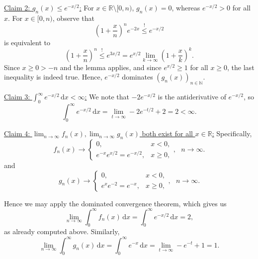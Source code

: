 \documentclass[10pt]{article}\usepackage[]{graphicx}\usepackage[]{color}
\newcommand{\N}{\mathbb{N}}
\newcommand{\R}{\mathbb{R}}
\newcommand{\df}{\,\textrm{d}}
\begin{document}
\uline{Claim 2: $g_n(x) \leq e^{-x/2}$:}
For $x \in \R \setminus [0,n)$, $g_n(x) = 0$, whereas $e^{-x/2} > 0$ for all $x$.
For $x \in [0,n)$, observe that
\[
 \left(1 + \frac{x}{n}\right)^n e^{-2x} \stackrel{!}{\leq} e^{-x/2}
\]
is equivalent to
\[
  \left(1 + \frac{x}{n}\right)^n \stackrel{!}{\leq} e^{3x/2} = e^{x/2}\lim_{k \to \infty}\left(1 + \frac{x}{k}\right)^k.
\]
Since $x \geq 0 > - n$ and the lemma applies,
and since $e^{x/2} \geq 1$ for all $x \geq 0$,
the last inequality is indeed true.
Hence, $e^{-x/2}$ dominates $(g_n(x))_{n \in \N}$.

\uline{Claim 3: $\int_{0}^{\infty} e^{-x/2} \df x < \infty$:}
We note that $-2e^{-x/2}$ is the antiderivative of $e^{-x/2}$,
so 
\[
\int_{0}^{\infty} e^{-x/2} \df x = \lim_{t \to \infty}-2e^{-t/2} + 2 = 2 < \infty.
\]

\uline{Claim 4: $\lim_{n \to \infty} f_n(x), \lim_{n \to \infty} g_n(x)$ both exist for all $x \in \R$:}
Specifically,
\[
  f_n(x) \to 
  \begin{cases}
  0,                          & x < 0, \\
  e^{-x}e^{x/2} = e^{-x/2},   & x \geq 0,
  \end{cases}, ~~~n \to \infty.
\]
and
\[
  g_n(x) \to \begin{cases}
  0,                          & x < 0,\\
  e^{x}e^{-2} = e^{-x},       & x \geq 0,
  \end{cases}, ~~~n \to \infty.
\]

Hence we may apply the dominated convergence theorem, which gives us
\[
  \lim_{n \to \infty} \int_{0}^{\infty} f_n(x) \df x = \int_0^{\infty} e^{-x/2} \df x = 2,
\]
as already computed above.
Similarly,
\[
  \lim_{n \to \infty} \int_{0}^{\infty} g_n(x) \df x = \int_0^{\infty} e^{-x} \df x = \lim_{t \to \infty}-e^{-t} + 1 = 1.
\]
\end{document}
